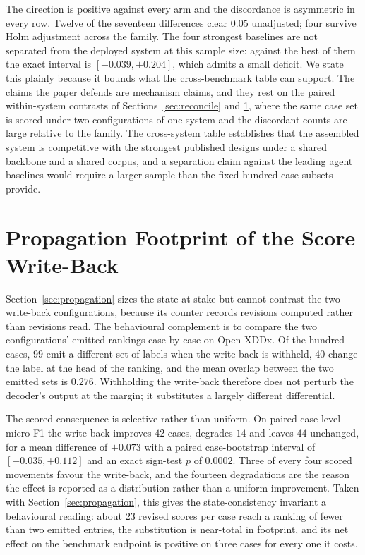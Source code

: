 \documentclass[letterpaper]{article}
\begin{document}
The direction is positive against every arm and the discordance is asymmetric in every row.
Twelve of the seventeen differences clear $0.05$ unadjusted; four survive Holm adjustment across the family.
The four strongest baselines are not separated from the deployed system at this sample size: against the best of them the exact interval is $[-0.039,+0.204]$, which admits a small deficit.
We state this plainly because it bounds what the cross-benchmark table can support.
The claims the paper defends are mechanism claims, and they rest on the paired within-system contrasts of Sections~\ref{sec:reconcile} and \ref{sec:footprint}, where the same case set is scored under two configurations of one system and the discordant counts are large relative to the family.
The cross-system table establishes that the assembled system is competitive with the strongest published designs under a shared backbone and a shared corpus, and a separation claim against the leading agent baselines would require a larger sample than the fixed hundred-case subsets provide.

\section{Propagation Footprint of the Score Write-Back}
\label{sec:footprint}

Section~\ref{sec:propagation} sizes the state at stake but cannot contrast the two write-back configurations, because its counter records revisions computed rather than revisions read.
The behavioural complement is to compare the two configurations' emitted rankings case by case on Open-XDDx.
Of the hundred cases, $99$ emit a different set of labels when the write-back is withheld, $40$ change the label at the head of the ranking, and the mean overlap between the two emitted sets is $0.276$.
Withholding the write-back therefore does not perturb the decoder's output at the margin; it substitutes a largely different differential.

The scored consequence is selective rather than uniform.
On paired case-level micro-F1 the write-back improves $42$ cases, degrades $14$ and leaves $44$ unchanged, for a mean difference of $+0.073$ with a paired case-bootstrap interval of $[+0.035,+0.112]$ and an exact sign-test $p$ of $0.0002$.
Three of every four scored movements favour the write-back, and the fourteen degradations are the reason the effect is reported as a distribution rather than a uniform improvement.
Taken with Section~\ref{sec:propagation}, this gives the state-consistency invariant a behavioural reading: about $23$ revised scores per case reach a ranking of fewer than two emitted entries, the substitution is near-total in footprint, and its net effect on the benchmark endpoint is positive on three cases for every one it costs.
\end{document}
